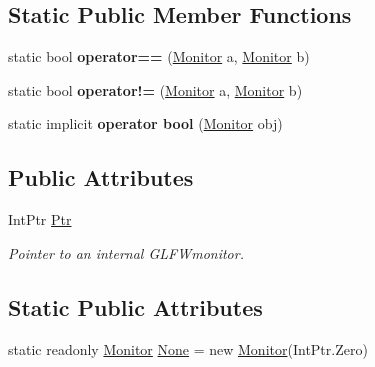 \subsection*{Static Public Member Functions}
\begin{DoxyCompactItemize}
\item 
\mbox{\label{struct_glfw3_1_1_glfw_1_1_monitor_ab28f6749de933caf2197c05c1b4be400}} 
static bool {\bfseries operator==} (\mbox{\hyperlink{struct_glfw3_1_1_glfw_1_1_monitor}{Monitor}} a, \mbox{\hyperlink{struct_glfw3_1_1_glfw_1_1_monitor}{Monitor}} b)
\item 
\mbox{\label{struct_glfw3_1_1_glfw_1_1_monitor_a8eecee0d34c40ed82238d0962fc84cc8}} 
static bool {\bfseries operator!=} (\mbox{\hyperlink{struct_glfw3_1_1_glfw_1_1_monitor}{Monitor}} a, \mbox{\hyperlink{struct_glfw3_1_1_glfw_1_1_monitor}{Monitor}} b)
\item 
\mbox{\label{struct_glfw3_1_1_glfw_1_1_monitor_a0b6f0574725829d3a08ccb3c3739ac19}} 
static implicit {\bfseries operator bool} (\mbox{\hyperlink{struct_glfw3_1_1_glfw_1_1_monitor}{Monitor}} obj)
\end{DoxyCompactItemize}
\subsection*{Public Attributes}
\begin{DoxyCompactItemize}
\item 
Int\+Ptr \mbox{\hyperlink{struct_glfw3_1_1_glfw_1_1_monitor_acc46b2a1c920a789433af0d3c7f31150}{Ptr}}
\begin{DoxyCompactList}\small\item\em Pointer to an internal G\+L\+F\+Wmonitor. \end{DoxyCompactList}\end{DoxyCompactItemize}
\subsection*{Static Public Attributes}
\begin{DoxyCompactItemize}
\item 
static readonly \mbox{\hyperlink{struct_glfw3_1_1_glfw_1_1_monitor}{Monitor}} \mbox{\hyperlink{struct_glfw3_1_1_glfw_1_1_monitor_a5183550cc653d890a7d52d054cd7ba1d}{None}} = new \mbox{\hyperlink{struct_glfw3_1_1_glfw_1_1_monitor}{Monitor}}(Int\+Ptr.\+Zero)
\end{DoxyCompactItemize}


